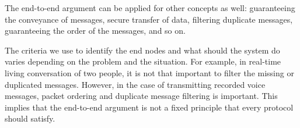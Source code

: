 \documentclass{homework}
\begin{document}
The end-to-end argument can be applied for other concepts as well: guaranteeing the conveyance of messages, secure transfer of data, filtering duplicate messages, guaranteeing the order of the messages, and so on.

The criteria we use to identify the end nodes and what should the system do varies depending on the problem and the situation. For example, in real-time living conversation of two people, it is not that important to filter the missing or duplicated messages. However, in the case of transmitting recorded voice messages, packet ordering and duplicate message filtering is important. This implies that the end-to-end argument is not a fixed principle that every protocol should satisfy.
\end{document}
